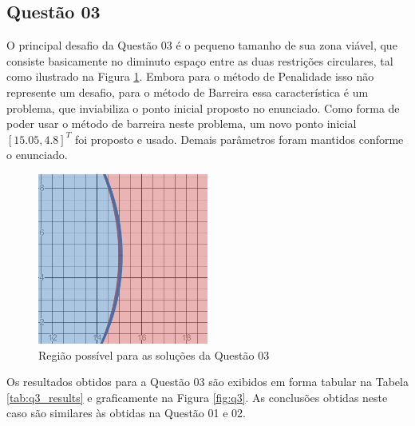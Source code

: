 \documentclass[10pt, a4paper]{article}
\begin{document}
\newpage

\subsection{Questão 03}

O principal desafio da Questão 03 é o pequeno tamanho de sua zona viável, que consiste basicamente no diminuto espaço entre as duas restrições circulares, tal como ilustrado na Figura \ref{fig:q3_valid}.
Embora para o método de Penalidade isso não represente um desafio, para o método de Barreira essa característica é um problema, que inviabiliza o ponto inicial proposto no enunciado. Como forma de poder
usar o método de barreira neste problema, um novo ponto inicial $[15.05, 4.8]^T$ foi proposto e usado. Demais parâmetros foram mantidos conforme o enunciado.

\begin{figure}[htpb]
  \centering
  \includegraphics[width=0.5\textwidth]{images/q3_visualizacao.png}
  \caption{Região possível para as soluções da Questão 03}
  \label{fig:q3_valid}
\end{figure}

Os resultados obtidos para a Questão 03 são exibidos em forma tabular na Tabela \ref{tab:q3_results} e graficamente na Figura \ref{fig:q3}. As conclusões obtidas neste caso são similares
às obtidas na Questão 01 e 02.
\end{document}
